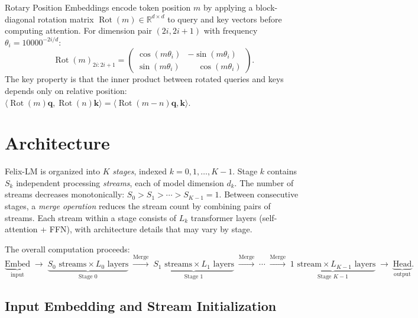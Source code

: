 \documentclass[11pt,a4paper]{article}
\theoremstyle{definition}
\theoremstyle{plain}
\theoremstyle{remark}
\newcommand{\R}{\mathbb{R}}
\newcommand{\Rot}{\operatorname{Rot}}
\begin{document}
Rotary Position Embeddings \cite{su2021roformer} encode token position $m$ 
by applying a block-diagonal rotation matrix $\Rot(m) \in \R^{d \times d}$ 
to query and key vectors before computing attention. For dimension pair 
$(2i, 2i+1)$ with frequency $\theta_i = 10000^{-2i/d}$:
\begin{equation}\label{eq:rope}
  \Rot(m)_{2i:2i+1} = 
  \begin{pmatrix} 
    \cos(m\theta_i) & -\sin(m\theta_i) \\ 
    \sin(m\theta_i) & \phantom{-}\cos(m\theta_i) 
  \end{pmatrix}.
\end{equation}
The key property is that the inner product between rotated queries and keys 
depends only on relative position: 
$\langle \Rot(m)\mathbf{q}, \Rot(n)\mathbf{k}\rangle = 
\langle \Rot(m-n)\mathbf{q}, \mathbf{k}\rangle$.

\section{Architecture}\label{sec:arch}

Felix-LM is organized into $K$ \emph{stages}, indexed $k = 0, 1, \ldots, 
K-1$. Stage $k$ contains $S_k$ independent processing \emph{streams}, each 
of model dimension $d_k$. The number of streams decreases monotonically: 
$S_0 > S_1 > \cdots > S_{K-1} = 1$. Between consecutive stages, a 
\emph{merge operation} reduces the stream count by combining pairs of 
streams. Each stream within a stage consists of $L_k$ transformer layers 
(self-attention + FFN), with architecture details that may vary by stage.

The overall computation proceeds:
\begin{equation}\label{eq:overall}
  \underbrace{\text{Embed}}_{\text{input}} 
  \;\to\; 
  \underbrace{S_0 \text{ streams} \times L_0 \text{ layers}}_{\text{Stage 0}}
  \;\xrightarrow{\text{Merge}}\;
  \underbrace{S_1 \text{ streams} \times L_1 \text{ layers}}_{\text{Stage 1}}
  \;\xrightarrow{\text{Merge}}\;
  \cdots
  \;\xrightarrow{\text{Merge}}\;
  \underbrace{1 \text{ stream} \times L_{K-1} \text{ layers}}_{\text{Stage } K{-}1}
  \;\to\;
  \underbrace{\text{Head}}_{\text{output}}.
\end{equation}

\subsection{Input Embedding and Stream Initialization}\label{sec:embed}
\end{document}
